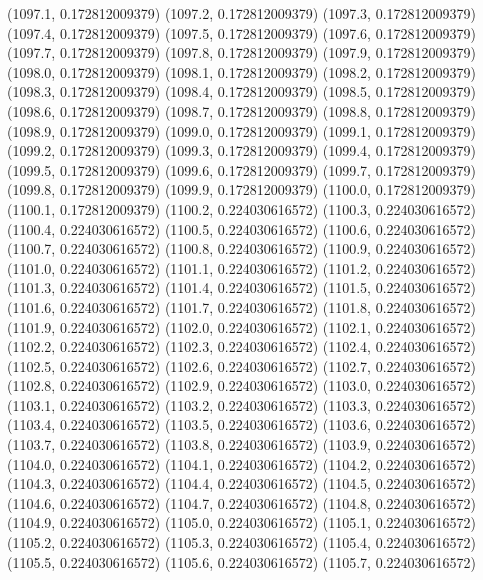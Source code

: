 {					(1097.1, 0.172812009379)
					(1097.2, 0.172812009379)
					(1097.3, 0.172812009379)
					(1097.4, 0.172812009379)
					(1097.5, 0.172812009379)
					(1097.6, 0.172812009379)
					(1097.7, 0.172812009379)
					(1097.8, 0.172812009379)
					(1097.9, 0.172812009379)
					(1098.0, 0.172812009379)
					(1098.1, 0.172812009379)
					(1098.2, 0.172812009379)
					(1098.3, 0.172812009379)
					(1098.4, 0.172812009379)
					(1098.5, 0.172812009379)
					(1098.6, 0.172812009379)
					(1098.7, 0.172812009379)
					(1098.8, 0.172812009379)
					(1098.9, 0.172812009379)
					(1099.0, 0.172812009379)
					(1099.1, 0.172812009379)
					(1099.2, 0.172812009379)
					(1099.3, 0.172812009379)
					(1099.4, 0.172812009379)
					(1099.5, 0.172812009379)
					(1099.6, 0.172812009379)
					(1099.7, 0.172812009379)
					(1099.8, 0.172812009379)
					(1099.9, 0.172812009379)
					(1100.0, 0.172812009379)
					(1100.1, 0.172812009379)
					(1100.2, 0.224030616572)
					(1100.3, 0.224030616572)
					(1100.4, 0.224030616572)
					(1100.5, 0.224030616572)
					(1100.6, 0.224030616572)
					(1100.7, 0.224030616572)
					(1100.8, 0.224030616572)
					(1100.9, 0.224030616572)
					(1101.0, 0.224030616572)
					(1101.1, 0.224030616572)
					(1101.2, 0.224030616572)
					(1101.3, 0.224030616572)
					(1101.4, 0.224030616572)
					(1101.5, 0.224030616572)
					(1101.6, 0.224030616572)
					(1101.7, 0.224030616572)
					(1101.8, 0.224030616572)
					(1101.9, 0.224030616572)
					(1102.0, 0.224030616572)
					(1102.1, 0.224030616572)
					(1102.2, 0.224030616572)
					(1102.3, 0.224030616572)
					(1102.4, 0.224030616572)
					(1102.5, 0.224030616572)
					(1102.6, 0.224030616572)
					(1102.7, 0.224030616572)
					(1102.8, 0.224030616572)
					(1102.9, 0.224030616572)
					(1103.0, 0.224030616572)
					(1103.1, 0.224030616572)
					(1103.2, 0.224030616572)
					(1103.3, 0.224030616572)
					(1103.4, 0.224030616572)
					(1103.5, 0.224030616572)
					(1103.6, 0.224030616572)
					(1103.7, 0.224030616572)
					(1103.8, 0.224030616572)
					(1103.9, 0.224030616572)
					(1104.0, 0.224030616572)
					(1104.1, 0.224030616572)
					(1104.2, 0.224030616572)
					(1104.3, 0.224030616572)
					(1104.4, 0.224030616572)
					(1104.5, 0.224030616572)
					(1104.6, 0.224030616572)
					(1104.7, 0.224030616572)
					(1104.8, 0.224030616572)
					(1104.9, 0.224030616572)
					(1105.0, 0.224030616572)
					(1105.1, 0.224030616572)
					(1105.2, 0.224030616572)
					(1105.3, 0.224030616572)
					(1105.4, 0.224030616572)
					(1105.5, 0.224030616572)
					(1105.6, 0.224030616572)
					(1105.7, 0.224030616572)
}
